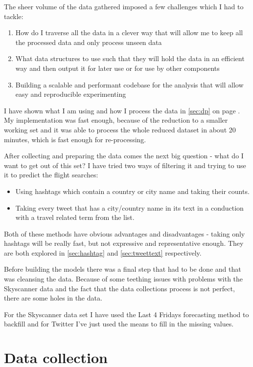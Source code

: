 \documentclass[minf,frontabs,twoside,singlespacing,parskip]{infthesis}
\begin{document}
The sheer volume of the data gathered imposed a few challenges which I had to tackle:
\begin{enumerate}
\item How do I traverse all the data in a clever way that will allow me to keep all the processed data and only process unseen data
\item What data structures to use such that they will hold the data in an efficient way and then output it for later use or for use by other components
\item Building a scalable and performant codebase for the analysis that will allow easy and reproducible experimenting
\end{enumerate}

I have shown what I am using and how I process the data in \ref{sec:dp} on page \pageref{sec:dp}. My implementation was fast enough, because of the reduction to a smaller working set and it was able to process the whole reduced dataset in about 20 minutes, which is fast enough for re-processing.

After collecting and preparing the data comes the next big question - what do I want to get out of this set? I have tried two ways of filtering it and trying to use it to predict the flight searches:
\begin{itemize}
\item Using hashtags which contain a country or city name and taking their counts.
\item Taking every tweet that has a city/country name in its text in a conduction with a travel related term from the list. 
\end{itemize}

Both of these methods have obvious advantages and disadvantages - taking only hashtags will be really fast, but not expressive and representative enough. They are both explored in  \ref{sec:hashtag} and \ref{sec:tweettext} respectively. 


Before building the models there was a final step that had to be done and that was cleansing the data. Because of some teething issues with problems with the Skyscanner data and the fact that the data collections process is not perfect, there are some holes in the data. 


For the Skyscanner data set I have used the Last 4 Fridays forecasting method to backfill and for Twitter I've just used the means to fill in the missing values. 

\section{Data collection}
\label{sec:dc}
\end{document}
